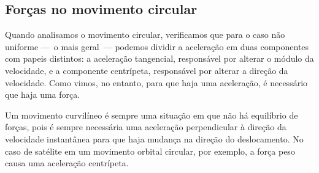 

\subsection{Forças no movimento circular}
\label{Sec:ForcasNoMovCircular}
   
Quando analisamos o movimento circular, verificamos que para o caso não uniforme ---~o mais geral~--- podemos dividir a aceleração em duas componentes com papeis distintos: a aceleração tangencial, responsável por alterar o módulo da velocidade, e a componente centrípeta, responsável por alterar a direção da velocidade. Como vimos, no entanto, para que haja uma aceleração, é necessário que haja uma força. 

\begin{marginfigure}[5cm]
\centering
{}
\caption{Um movimento curvilíneo é sempre uma situação em que não há equilíbrio de forças, pois é sempre necessária uma aceleração perpendicular à direção da velocidade instantânea para que haja mudança na direção do deslocamento. No caso de satélite em um movimento orbital circular, por exemplo, a força peso causa uma aceleração centrípeta.}
\end{marginfigure}

